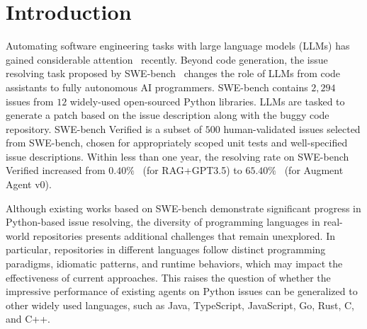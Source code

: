 \documentclass[11pt, a4paper, logo, copyright, nonumbering]{seed}
\begin{document}
\newpage

\tableofcontents


\newpage

\section{Introduction}

Automating software engineering tasks with large language models (LLMs) has gained considerable attention~\citep{nl2code,zheng2023survey,survey_2,survey_3} recently.
Beyond code generation, the issue resolving task proposed by SWE-bench~\citep{swe-bench} changes the role of LLMs from code assistants to fully autonomous AI programmers.
SWE-bench contains $2,294$ issues from $12$ widely-used open-sourced Python libraries.
LLMs are tasked to generate a patch based on the issue description along with the buggy code repository.
SWE-bench Verified is a subset of $500$ human-validated issues selected from SWE-bench, chosen for appropriately scoped unit tests and well-specified issue descriptions.
Within less than one year, the resolving rate on SWE-bench Verified increased from $0.40\%$~\citep{swe-bench} (for RAG+GPT3.5) to $65.40\%$~\citep{augmentagentv0} (for Augment Agent v0).


Although existing works based on SWE-bench demonstrate significant progress in Python-based issue resolving, the diversity of programming languages in real-world repositories presents additional challenges that remain unexplored. 
In particular, repositories in different languages follow distinct programming paradigms, idiomatic patterns, and runtime behaviors, which may impact the effectiveness of current approaches. 
This raises the question of whether the impressive performance of existing agents on Python issues can be generalized to other widely used languages, such as Java, TypeScript, JavaScript, Go, Rust, C, and C++.
\end{document}
